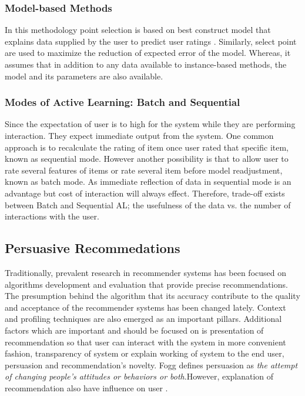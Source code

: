 \subsubsection{Model-based Methods}

In this methodology point selection is based on best construct model that explains data supplied by the user to predict user ratings \cite{adomavicius2005toward}. Similarly, select point are used to maximize the reduction of expected error of the model. Whereas, it assumes that in addition to any data available to instance-based methods, the model and its parameters are also available. 

\subsubsection{Modes of Active Learning: Batch and Sequential}

Since the expectation of user is to high for the system while they are performing interaction. They expect immediate output from the system. One common approach is to recalculate the rating of item once user rated that specific item, known as sequential mode. However another possibility is that to allow user to rate several features of items or rate several item before model readjustment, known as batch mode. As immediate reflection of data in sequential mode is an advantage but cost of interaction will always effect. Therefore, trade-off exists between Batch and Sequential AL; the usefulness of the data vs. the number of interactions with the user. 

\subsection{Persuasive Recommedations}

Traditionally, prevalent research in recommender systems has been focused on algorithms development and evaluation that provide precise recommendations\cite{xiao2007commerce}. The presumption behind the algorithm that its accuracy contribute to the quality and acceptance of the recommender systems has been changed lately\cite{nanou2010effects}. Context and profiling techniques are also emerged as an important pillars. Additional factors which are important and should be focused on is presentation of recommendation so that user can interact with the system in more convenient fashion\cite{nanou2010effects}, transparency of system or explain working of system to the end user\cite{sinha2002role}, persuasion\cite{pu2012evaluating} and recommendation’s novelty\cite{cremonesi2012investigating}. Fogg \cite{fogg1998persuasive} defines persuasion as \textit{the attempt of changing people’s attitudes or behaviors or both}.However, explanation of recommendation also have influence on user \cite{mcsherry2005explanation} \cite {herlocker2000explaining}.

